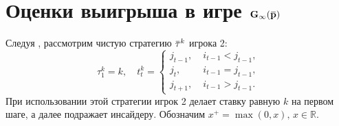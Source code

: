 {\section{Оценки выигрыша в игре $\mathbf{G_\infty(\p)}$}
\label{sec:payoff-bounds}

Следуя \cite{domansky11}, рассмотрим чистую стратегию $\tauv^k$ игрока 2:
\begin{equation*}
  \tau^k_1 = k, \quad
  t^k_t = \begin{cases}
    j_{t-1}, &\; i_{t-1} < j_{t-1},\\
    j_t, &\; i_{t-1} = j_{t-1},\\
    j_{t+1}, &\; i_{t-1} > j_{t-1}.
  \end{cases}
\end{equation*}
При использовании этой стратегии игрок 2 делает ставку равную $k$ на первом
шаге, а далее подражает инсайдеру. Обозначим $x^+ = \max(0, x), \, x \in
\mathbb{R}$.

}
